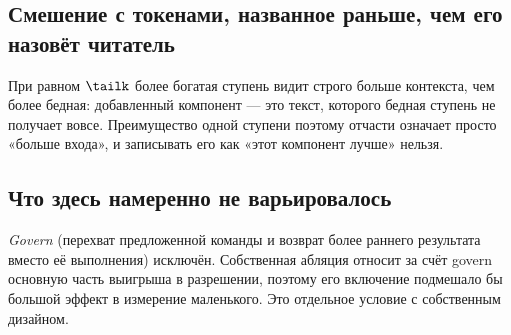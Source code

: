 
\subsection{Смешение с токенами, названное раньше, чем его назовёт читатель}

При равном $\tailk$ более богатая ступень видит строго больше контекста,
чем более бедная: добавленный компонент — это текст, которого бедная ступень
не получает вовсе. Преимущество одной ступени поэтому отчасти означает
просто «больше входа», и записывать его как «этот компонент лучше» нельзя.


\subsection{Что здесь намеренно не варьировалось}

\emph{Govern} (перехват предложенной команды и возврат более раннего
результата вместо её выполнения) исключён. Собственная абляция \Ledger{}
относит за счёт govern основную часть выигрыша в разрешении\origin, поэтому
его включение подмешало бы большой эффект в измерение маленького. Это
отдельное условие с собственным дизайном.
